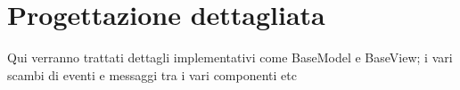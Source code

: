 \section{Progettazione dettagliata}\label{sec:progettazione}
Qui verranno trattati dettagli implementativi come BaseModel e BaseView;
i vari scambi di eventi e messaggi tra i vari componenti etc
